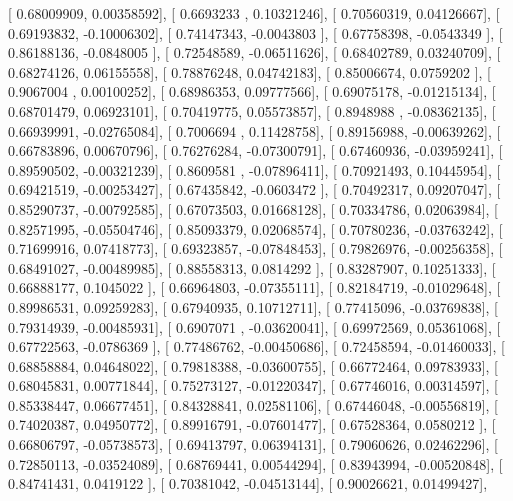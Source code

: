 \documentclass{article}
\begin{document}
       [ 0.68009909,  0.00358592],
       [ 0.6693233 ,  0.10321246],
       [ 0.70560319,  0.04126667],
       [ 0.69193832, -0.10006302],
       [ 0.74147343, -0.0043803 ],
       [ 0.67758398, -0.0543349 ],
       [ 0.86188136, -0.0848005 ],
       [ 0.72548589, -0.06511626],
       [ 0.68402789,  0.03240709],
       [ 0.68274126,  0.06155558],
       [ 0.78876248,  0.04742183],
       [ 0.85006674,  0.0759202 ],
       [ 0.9067004 ,  0.00100252],
       [ 0.68986353,  0.09777566],
       [ 0.69075178, -0.01215134],
       [ 0.68701479,  0.06923101],
       [ 0.70419775,  0.05573857],
       [ 0.8948988 , -0.08362135],
       [ 0.66939991, -0.02765084],
       [ 0.7006694 ,  0.11428758],
       [ 0.89156988, -0.00639262],
       [ 0.66783896,  0.00670796],
       [ 0.76276284, -0.07300791],
       [ 0.67460936, -0.03959241],
       [ 0.89590502, -0.00321239],
       [ 0.8609581 , -0.07896411],
       [ 0.70921493,  0.10445954],
       [ 0.69421519, -0.00253427],
       [ 0.67435842, -0.0603472 ],
       [ 0.70492317,  0.09207047],
       [ 0.85290737, -0.00792585],
       [ 0.67073503,  0.01668128],
       [ 0.70334786,  0.02063984],
       [ 0.82571995, -0.05504746],
       [ 0.85093379,  0.02068574],
       [ 0.70780236, -0.03763242],
       [ 0.71699916,  0.07418773],
       [ 0.69323857, -0.07848453],
       [ 0.79826976, -0.00256358],
       [ 0.68491027, -0.00489985],
       [ 0.88558313,  0.0814292 ],
       [ 0.83287907,  0.10251333],
       [ 0.66888177,  0.1045022 ],
       [ 0.66964803, -0.07355111],
       [ 0.82184719, -0.01029648],
       [ 0.89986531,  0.09259283],
       [ 0.67940935,  0.10712711],
       [ 0.77415096, -0.03769838],
       [ 0.79314939, -0.00485931],
       [ 0.6907071 , -0.03620041],
       [ 0.69972569,  0.05361068],
       [ 0.67722563, -0.0786369 ],
       [ 0.77486762, -0.00450686],
       [ 0.72458594, -0.01460033],
       [ 0.68858884,  0.04648022],
       [ 0.79818388, -0.03600755],
       [ 0.66772464,  0.09783933],
       [ 0.68045831,  0.00771844],
       [ 0.75273127, -0.01220347],
       [ 0.67746016,  0.00314597],
       [ 0.85338447,  0.06677451],
       [ 0.84328841,  0.02581106],
       [ 0.67446048, -0.00556819],
       [ 0.74020387,  0.04950772],
       [ 0.89916791, -0.07601477],
       [ 0.67528364,  0.0580212 ],
       [ 0.66806797, -0.05738573],
       [ 0.69413797,  0.06394131],
       [ 0.79060626,  0.02462296],
       [ 0.72850113, -0.03524089],
       [ 0.68769441,  0.00544294],
       [ 0.83943994, -0.00520848],
       [ 0.84741431,  0.0419122 ],
       [ 0.70381042, -0.04513144],
       [ 0.90026621,  0.01499427],
\end{document}
